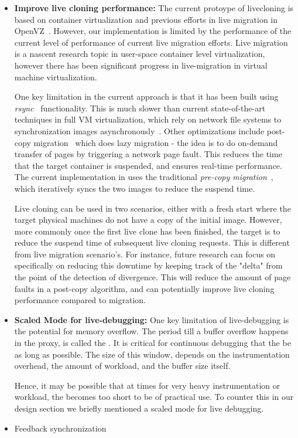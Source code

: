 \begin{itemize}
	\item \textbf{Improve live cloning performance:}
	The current protoype of livecloning is based on container virtualization and previous efforts in live migration in OpenVZ~\cite{openvz}.
	However, our implementation is limited by the performance of the current level of performance of current live migration efforts.
	Live migration is a nascent research topic in user-space container level virtualization, however there has been significant progress in live-migration in virtual machine virtualization.
	
	One key limitation in the current approach is that it has been built using \emph{rsync}~\cite{rsync} functionality. This is much slower than current state-of-the-art techniques in full VM virtualization, which rely on network file systems to synchronization images asynchronously~\cite{nfs}. Other optimizations include post-copy migration~\cite{postcopy} which does lazy migration - the idea is to do on-demand transfer of pages by triggering a network page fault. 
	This reduces the time that the target container is suspended, and ensures real-time performance.
	The current implementation in \parikshan uses the traditional \emph{pre-copy migration}~\cite{clark2005live}, which iteratively syncs the two images to reduce the suspend time.
	
	Live cloning can be used in two scenarios, either with a fresh start where the target physical machines do not have a copy of the initial image. 
	However, more commonly once the first live clone has been finished, the target is to reduce the suspend time of subsequent live cloning requests. 
	This is different from live migration scenario's.
	For instance, future research can focus on specifically on reducing this downtime by keeping track of the "delta" from the point of the detection of divergence.
	This will reduce the amount of page faults in a post-copy algorithm, and can potentially improve live cloning performance compared to migration.
	
	
	\item \textbf{Scaled Mode for live-debugging:}
	One key limitation of live-debugging is the potential for memory overflow. The period till a buffer overflow happens in the proxy, is called the \debugwindow. It is critical for continuous debugging that the \debugwindow be as long as possible.
	The size of this window, depends on the instrumentation overhead, the amount of workload, and the buffer size itself. 
	
	Hence, it may be possible that at times for very heavy instrumentation or workload, the \debugwindow becomes too short to be of practical use. To counter this in our design section we briefly mentioned a scaled mode for live debugging. 
	
	\item Feedback synchronization
\end{itemize}

